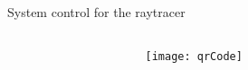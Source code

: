 \documentclass[final,hyperref={pdfpagelabels=false}]{beamer}
\begin{document}
\begin{frame}[t]
\begin{columns}[t]
\begin{column}{.465\textwidth}
\begin{block}{System control for the raytracer}
   
   
   
   
   
   
     
   
   
\end{block}


\end{column} %



\begin{column}{.025\textwidth}\end{column} %

\end{columns} %











\begin{columns}

\begin{column}{0.02\textwidth}\end{column} %

\begin{column}{0.15\textwidth}
\begin{figure}[h]
\centering
\texttt{[image: qrCode]}
\end{figure}
\end{column}

\begin{column}{0.01\textwidth}\end{column} %


\end{columns}
\end{frame}
\end{document}
